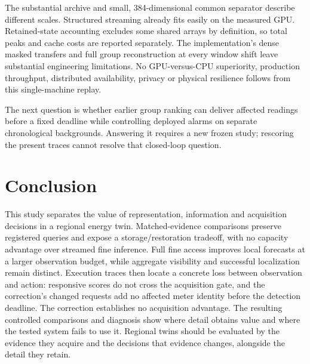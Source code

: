 \documentclass[conference]{IEEEtran}
\begin{document}
The substantial archive and small, 384-dimensional common separator describe different scales. Structured streaming already fits easily on the measured GPU. Retained-state accounting excludes some shared arrays by definition, so total peaks and cache costs are reported separately. The implementation's dense masked transfers and full group reconstruction at every window shift leave substantial engineering limitations. No GPU-versus-CPU superiority, production throughput, distributed availability, privacy or physical resilience follows from this single-machine replay.

The next question is whether earlier group ranking can deliver affected readings before a fixed deadline while controlling deployed alarms on separate chronological backgrounds. Answering it requires a new frozen study; rescoring the present traces cannot resolve that closed-loop question.

\section{Conclusion}
This study separates the value of representation, information and acquisition decisions in a regional energy twin. Matched-evidence comparisons preserve registered queries and expose a storage/restoration tradeoff, with no capacity advantage over streamed fine inference. Full fine access improves local forecasts at a larger observation budget, while aggregate visibility and successful localization remain distinct. Execution traces then locate a concrete loss between observation and action: responsive scores do not cross the acquisition gate, and the correction's changed requests add no affected meter identity before the detection deadline. The correction establishes no acquisition advantage. The resulting controlled comparisons and diagnosis show where detail obtains value and where the tested system fails to use it. Regional twins should be evaluated by the evidence they acquire and the decisions that evidence changes, alongside the detail they retain.



\end{document}
